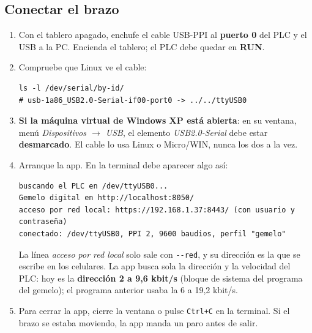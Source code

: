 \documentclass[a4paper,11pt]{article}
\newcommand{\codigo}[1]{\texttt{#1}}
\begin{document}
\subsection{Conectar el brazo}
\begin{enumerate}
\item Con el tablero apagado, enchufe el cable USB-PPI al \textbf{puerto 0} del PLC y el USB a la PC. Encienda el tablero; el PLC debe quedar en \textbf{RUN}.
\item Compruebe que Linux ve el cable:
\begin{lstlisting}
ls -l /dev/serial/by-id/
# usb-1a86_USB2.0-Serial-if00-port0 -> ../../ttyUSB0
\end{lstlisting}
\item \textbf{Si la máquina virtual de Windows XP está abierta}: en su ventana, menú \emph{Dispositivos $\rightarrow$ USB}, el elemento \emph{USB2.0-Serial} debe estar \textbf{desmarcado}. El cable lo usa Linux o Micro/WIN, nunca los dos a la vez.
\item Arranque la app. En la terminal debe aparecer algo así:
\begin{lstlisting}
buscando el PLC en /dev/ttyUSB0...
Gemelo digital en http://localhost:8050/
acceso por red local: https://192.168.1.37:8443/ (con usuario y contraseña)
conectado: /dev/ttyUSB0, PPI 2, 9600 baudios, perfil "gemelo"
\end{lstlisting}
La línea \emph{acceso por red local} solo sale con \codigo{-{}-red}, y su dirección es la que se escribe en los celulares. La app busca sola la dirección y la velocidad del PLC: hoy es la \textbf{dirección 2 a 9,6 kbit/s} (bloque de sistema del programa del gemelo); el programa anterior usaba la 6 a 19,2 kbit/s.
\item Para cerrar la app, cierre la ventana o pulse \codigo{Ctrl+C} en la terminal. Si el brazo se estaba moviendo, la app manda un paro antes de salir.
\end{enumerate}
\end{document}

